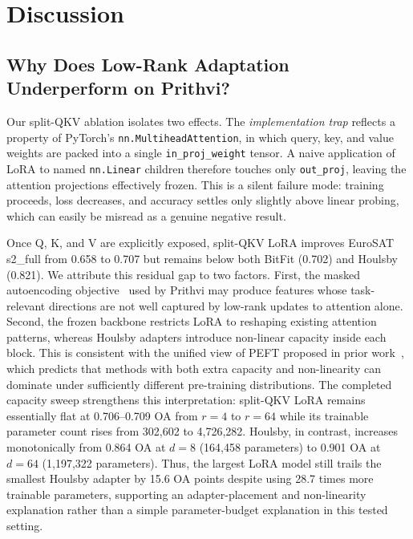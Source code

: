 \section{Discussion}
\label{sec:discussion}

\subsection{Why Does Low-Rank Adaptation Underperform on Prithvi?}
Our split-QKV ablation isolates two effects. The \emph{implementation trap} reflects a property of PyTorch's \texttt{nn.MultiheadAttention}, in which query, key, and value weights are packed into a single \texttt{in\_proj\_weight} tensor. A naive application of LoRA to named \texttt{nn.Linear} children therefore touches only \texttt{out\_proj}, leaving the attention projections effectively frozen. This is a silent failure mode: training proceeds, loss decreases, and accuracy settles only slightly above linear probing, which can easily be misread as a genuine negative result.

Once Q, K, and V are explicitly exposed, split-QKV LoRA improves EuroSAT s2\_full from 0.658 to 0.707 but remains below both BitFit (0.702) and Houlsby (0.821). We attribute this residual gap to two factors. First, the masked autoencoding objective~\cite{he2022mae} used by Prithvi may produce features whose task-relevant directions are not well captured by low-rank updates to attention alone. Second, the frozen backbone restricts LoRA to reshaping existing attention patterns, whereas Houlsby adapters introduce non-linear capacity inside each block. This is consistent with the unified view of PEFT proposed in prior work~\cite{he2022unified}, which predicts that methods with both extra capacity and non-linearity can dominate under sufficiently different pre-training distributions. The completed capacity sweep strengthens this interpretation: split-QKV LoRA remains essentially flat at 0.706--0.709 OA from $r=4$ to $r=64$ while its trainable parameter count rises from 302{,}602 to 4{,}726{,}282. Houlsby, in contrast, increases monotonically from 0.864 OA at $d=8$ (164{,}458 parameters) to 0.901 OA at $d=64$ (1{,}197{,}322 parameters). Thus, the largest LoRA model still trails the smallest Houlsby adapter by 15.6 OA points despite using 28.7 times more trainable parameters, supporting an adapter-placement and non-linearity explanation rather than a simple parameter-budget explanation in this tested setting.

